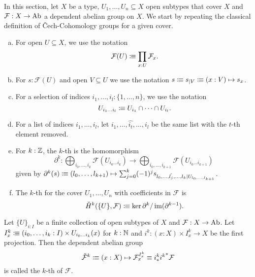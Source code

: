 
In this section, let $X$ be a type, $U_1,\dots,U_n\subseteq X$ open subtypes that cover $X$
and $\mathcal F:X\to \operatorname{Ab}$ a dependent abelian group on $X$.
We start by repeating the classical definition of \v{C}ech-Cohomology groups for a given cover.

\begin{definition}%
  \label{chech-complex}
  \begin{enumerate}[(a)]
  \item {} For open $U\subseteq X$, we use the notation
    \[
      \mathcal F(U)\colonequiv \prod_{x:U}\mathcal F_x\rlap{.}
    \]
  \item For $s:\mathcal F(U)$ and open $V\subseteq U$ we use the notation $s\vcentcolon\mspace{-1.2mu}\equiv s_{|V} \vcentcolon\mspace{-1.2mu}\equiv (x:V)\mapsto s_x$.
  \item {}For a selection of indices $i_1,...,i_l:\{1,\dots,n\}$, we use the notation
    \[
      U_{i_1\dots i_l}\colonequiv U_{i_1}\cap\dots\cap U_{i_l}\rlap{.}
    \]
  \item For a list of indices $i_1,\dots,i_l$, let $i_1,\dots,\hat{i_t},\dots,i_l$ be the same list with the $t$-th element removed.
  \item For $k:\mathbb{Z}$, the $k$-th  is the homomorphism
    \[
      \partial^k:\bigoplus_{i_0,\dots,i_k}\mathcal F(U_{i_0\dots i_k})\to \bigoplus_{i_0,\dots,i_{k+1}}\mathcal F(U_{i_0\dots i_{k+1}})
    \]
    given by $\partial^k(s)\vcentcolon\mspace{-1.2mu}\equiv (l_0,\dots,l_{k+1}) \mapsto \sum_{j=0}^k (-1)^j s_{l_0,\dots,\hat{l_j},\dots,l_k|U_{l_0,\dots,l_{k+1}}}$.
  \item The $k$-th  for the cover $U_1,\dots,U_n$ with coefficients in $\mathcal F$ is
    \[
      \check{H}^k(\{U\},\mathcal F)\colonequiv \ker\partial^{k} / \im(\partial^{k-1})\rlap{.}
    \]
  \end{enumerate}
\end{definition}

\begin{definition}
  \label{sheaf-cech}
  Let $\{U\}_{i:I}$ be a finite collection of open subtypes of $X$ and $\mathcal F : X\to \operatorname{Ab}$.
  Let $I_x^k\vcentcolon\mspace{-1.2mu}\equiv (i_0, \dots, i_k:I)\times U_{i_0\dots i_k}(x)$ for $k:\mathbb{N}$ and $i^k:(x:X)\times I^k_x\to X$ be the first projection.
  Then the dependent abelian group
  \[ \check{\mathcal F}^k\vcentcolon\mspace{-1.2mu}\equiv (x:X)\mapsto \mathcal F_x^{I_x^k} \equiv i^k_\ast {i^k}^\ast\mathcal F \]
  is called the $k$-th  of $\mathcal F$.
\end{definition}

